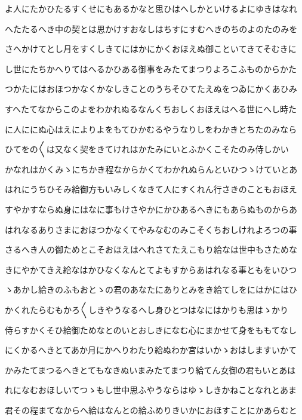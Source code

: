 \documentclass[a4paper,11pt,landscape]{ltjtarticle}
\begin{document}
よ人にたかひたるすくせにもあるかなと思ひはへしかといけるよにゆきはなれ
\par\medskip
へたたるへき中の契とは思かけすおなしはちすにすむへきのちのよのたのみを
\par\medskip
さへかけてとし月をすくしきてにはかにかくおほえぬ御こといてきてそむきに
\par\medskip
し世にたちかへりてはへるかひある御事をみたてまつりよろこふものからかた
\par\medskip
つかたにはおほつかなくかなしきことのうちそひてたえぬをつゐにかくあひみ
\par\medskip
すへたてなからこのよをわかれぬるなんくちおしくおほえはへる世にへし時た
\par\medskip
に人ににぬ心はえによりよをもてひかむるやうなりしをわかきとちたのみなら
\par\medskip
ひてをの〱は又なく契をきてけれはかたみにいとふかくこそたのみ侍しかい
\par\medskip
かなれはかくみゝにちかき程なからかくてわかれぬらんといひつゝけていとあ
\par\medskip
はれにうちひそみ給御方もいみしくなきて人にすくれん行さきのこともおほえ
\par\medskip
すやかすならぬ身にはなに事もけさやかにかひあるへきにもあらぬものからあ
\par\medskip
はれなるありさまにおほつかなくてやみなむのみこそくちおしけれよろつの事
\par\medskip
さるへき人の御ためとこそおほえはへれさてたえこもり給なは世中もさためな
\par\medskip
きにやかてきえ給なはかひなくなんとてよもすからあはれなる事ともをいひつ
\par\medskip
ゝあかし給きのふもおとゝの君のあなたにありとみをき給てしをにはかにはひ
\par\medskip
かくれたらむもかろ〱しきやうなるへし身ひとつはなにはかりも思はゝかり
\par\medskip
侍らすかくそひ給御ためなとのいとおしきになむ心にまかせて身をももてなし
\par\medskip
にくかるへきとてあか月にかへりわたり給ぬわか宮はいかゝおはしますいかて
\par\medskip
かみたてまつるへきとてもなきぬいまみたてまつり給てん女御の君もいとあは
\par\medskip
れになむおほしいてつゝもし世中思ふやうならはゆゝしきかねことなれとあま
\par\medskip
君その程まてなからへ給はなんとの給ふめりきいかにおほすことにかあらむと
\par\medskip
\end{document}
